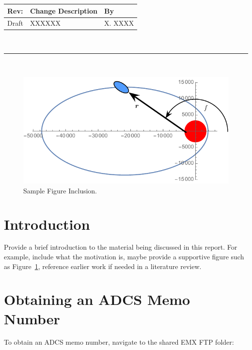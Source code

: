 \documentclass[]{LASPReportMemo}
\begin{document}
\makeCover


%
%
\pagestyle{empty}
{\renewcommand{\arraystretch}{2}
\noindent
\begin{longtable}{|p{0.5in}|p{4.5in}|p{1.14in}|}
\hline
{\bfseries Rev}: & {\bfseries Change Description} & {\bfseries By} \\
\hline
Draft & XXXXXX & X. XXXX \\
\hline

\end{longtable}
}

\newpage
\setcounter{page}{1}
\pagestyle{fancy}

\tableofcontents
~\\ \hrule ~\\

\begin{figure}[htb]
	\centerline{
	\includegraphics[]{Figures/Fig1}
	}
	\caption{Sample Figure Inclusion.}
	\label{fig:Fig1}
\end{figure}

\section{Introduction}
Provide a brief introduction to the material being discussed in this report.  For example, include what the motivation is, maybe provide a supportive figure such as Figure~\ref{fig:Fig1}, reference earlier work if needed in a literature review.


\section{Obtaining an ADCS Memo Number}
To obtain an ADCS memo number, navigate to the shared EMX FTP folder:\\
\end{document}
